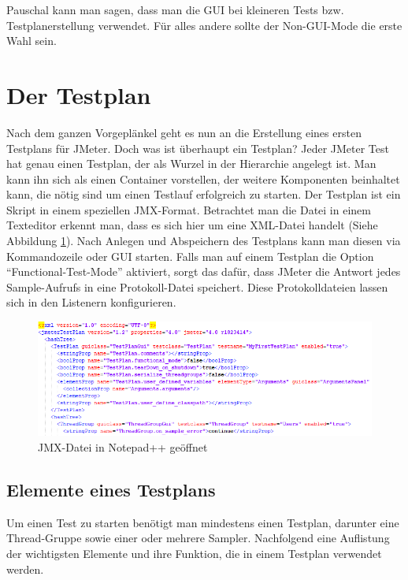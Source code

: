 \documentclass[a4paper,12pt]{article}
\begin{document}
Pauschal kann man sagen, dass man die GUI bei kleineren Tests bzw. Testplanerstellung verwendet. Für alles andere sollte der Non-GUI-Mode die erste Wahl sein.

\section{Der Testplan}
Nach dem ganzen Vorgeplänkel geht es nun an die Erstellung eines ersten Testplans für JMeter.
Doch was ist überhaupt ein Testplan? Jeder JMeter Test hat genau einen Testplan, der als Wurzel in der Hierarchie angelegt ist. Man kann ihn sich als einen Container vorstellen, der weitere Komponenten beinhaltet kann, die nötig sind um einen Testlauf erfolgreich zu starten. Der Testplan ist ein Skript in einem speziellen JMX-Format. Betrachtet man die Datei in einem Texteditor erkennt man, dass es sich hier um eine XML-Datei handelt (Siehe Abbildung \ref{fig:jmx_xml}). Nach Anlegen und Abspeichern des Testplans kann man diesen via Kommandozeile oder GUI starten. Falls man auf einem Testplan die Option "`Functional-Test-Mode"' aktiviert, sorgt das dafür, dass JMeter die Antwort jedes Sample-Aufrufs in eine Protokoll-Datei speichert. Diese Protokolldateien lassen sich in den Listenern konfigurieren.

\begin{figure}[htb]%
 \centering
    \includegraphics[width=1\textwidth]{bilder/jmx_xml.png}
  \caption{JMX-Datei in Notepad++ geöffnet}
  \label{fig:jmx_xml}
\end{figure}

\subsection{Elemente eines Testplans}
Um einen Test zu starten benötigt man mindestens einen Testplan, darunter eine Thread-Gruppe sowie einer oder mehrere Sampler. Nachfolgend eine Auflistung der wichtigsten Elemente und ihre Funktion, die in einem Testplan verwendet werden.
\end{document}
